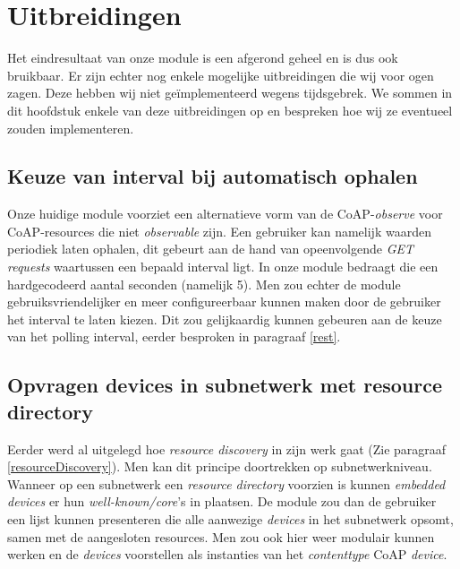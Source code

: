 \chapter{Uitbreidingen} \label{uitbreidingen}

Het eindresultaat van onze module is een afgerond geheel en is dus ook bruikbaar. Er zijn echter nog enkele mogelijke uitbreidingen die wij voor ogen zagen. Deze hebben wij niet ge\"{i}mplementeerd wegens tijdsgebrek. We sommen in dit hoofdstuk enkele van deze uitbreidingen op en bespreken hoe wij ze eventueel zouden implementeren.

\section{Keuze van interval bij automatisch ophalen}
Onze huidige module voorziet een alternatieve vorm van de CoAP-\textit{observe} voor CoAP-resources die niet \textit{observable} zijn. Een gebruiker kan namelijk waarden periodiek laten ophalen, dit gebeurt aan de hand van opeenvolgende \textit{GET requests} waartussen een bepaald interval ligt. In onze module bedraagt die een hardgecodeerd aantal seconden (namelijk 5). Men zou echter de module gebruiksvriendelijker en meer configureerbaar kunnen maken door de gebruiker het interval te laten kiezen. Dit zou gelijkaardig kunnen gebeuren aan de keuze van het polling interval, eerder besproken in paragraaf \ref{rest}.

\section{Opvragen devices in subnetwerk met resource directory} \label{resourceDirectory}
Eerder werd al uitgelegd hoe \textit{resource discovery} in zijn werk gaat (Zie paragraaf \ref{resourceDiscovery}). Men kan dit principe doortrekken op subnetwerkniveau. Wanneer op een subnetwerk een \textit{resource directory} voorzien is
kunnen \textit{embedded devices} er hun \textit{well-known/core}'s in plaatsen. De module zou dan de gebruiker een lijst kunnen presenteren die alle aanwezige \textit{devices} in het subnetwerk opsomt, samen met de aangesloten resources. Men zou ook hier weer modulair kunnen werken en de \textit{devices} voorstellen als instanties van het \textit{contenttype} CoAP \textit{device}.\\

